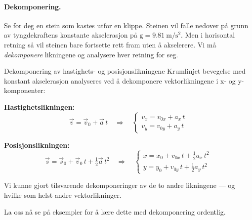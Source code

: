 \paragraph{Dekomponering.} Se for deg en stein som kastes utfor en klippe. Steinen vil falle nedover på grunn av tyngdekraftens konstante akselerasjon på $\text{g}=\SI{9.81}{\metre\per\second\squared}$. Men i horisontal retning så vil steinen bare fortsette rett fram uten å akselerere. Vi må \textit{dekomponere} likningene og analysere hver retning for seg. 

\begin{myoppsum*}{Dekomponering av hastighets- og posisjonslikningene}
Krumlinjet bevegelse med konstant akselerasjon analyseres ved å dekomponere vektorlikningene i x- og y-komponenter:

\medskip
\textbf{Hastighetslikningen:}
\[
  \vec{v} = \vec{v}_0 + \vec{a}\,t
  \quad\Longrightarrow\quad
  \begin{cases}
    v_x = v_{0x} + a_x\,t \\[5pt]
    v_y = v_{0y} + a_y\,t
  \end{cases}
\]

\medskip
\textbf{Posisjonslikningen:}
\[
  \vec{s} = \vec{s}_0 + \vec{v}_0\,t + \tfrac{1}{2}\vec{a}\,t^2
  \quad\Longrightarrow\quad
  \begin{cases}
    x = x_0 + v_{0x}\,t + \tfrac{1}{2}a_x\,t^2 \\[5pt]
    y = y_0 + v_{0y}\,t + \tfrac{1}{2}a_y\,t^2
  \end{cases}
\]
\end{myoppsum*}
Vi kunne gjort tilsvarende dekomponeringer av de to andre likningene — og hvilke som helst andre vektorlikninger.

La oss nå se på eksempler for å lære dette med dekomponering ordentlig.

